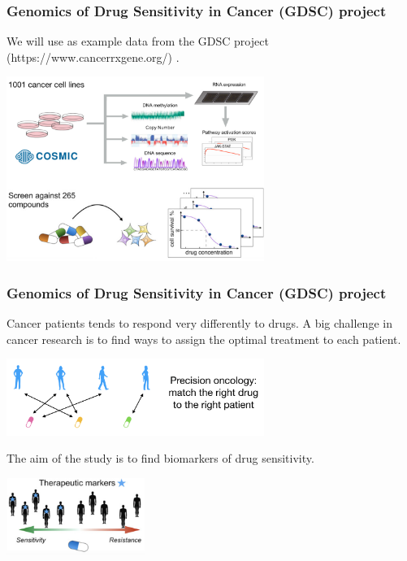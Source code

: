 \documentclass[notes]{beamer}          %
\begin{document}
\begin{frame}
\frametitle{Genomics of Drug Sensitivity in Cancer (GDSC) project}
We will use as example data from the GDSC project (https://www.cancerrxgene.org/) \cite{GDSC}.

\begin{center}
\includegraphics[height=6cm]{../figures/week_2_linear_models/GDSC_study_description.png}
\end{center}

\end{frame}

\begin{frame}
\frametitle{Genomics of Drug Sensitivity in Cancer (GDSC) project}
Cancer patients tends to respond very differently to drugs. A big challenge in cancer research 
is to find ways to assign the optimal treatment to each patient.

\begin{center}
\includegraphics[height=2.5cm]{../figures/week_2_linear_models/precision_oncology.png}
\end{center}

The aim of the study is to find biomarkers of drug sensitivity.

\begin{center}
\includegraphics[height=2.5cm]{../figures/week_2_linear_models/GDSC_study_aim.png}
\end{center}

\end{frame}
\end{document}
